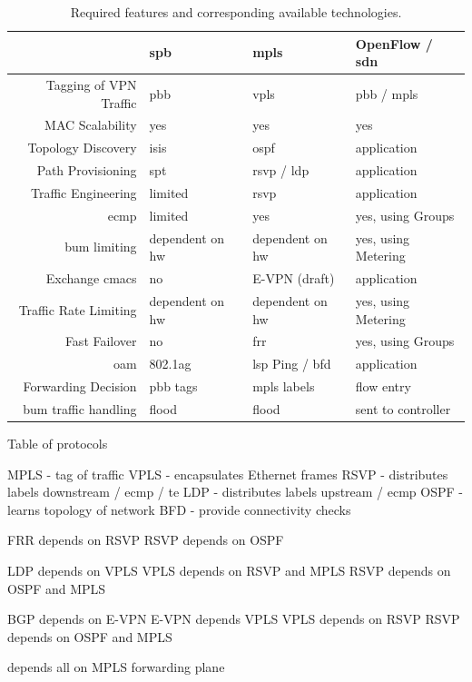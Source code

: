 \begin{table}[h]
	\centering
	\begin{tabular}{r|lll}
	 & \acs{spb} & \acs{mpls} & OpenFlow / \acs{sdn}\\
	\hline
	Tagging of VPN Traffic & \acs{pbb} & \acs{vpls} & \acs{pbb} / \acs{mpls}\\
	MAC Scalability & yes & yes & yes\\
	Topology Discovery & \acs{isis} & \acs{ospf} & application\\
	Path Provisioning & \acs{spt} & \acs{rsvp} / \acs{ldp} & application\\
	Traffic Engineering & limited & \acs{rsvp} & application\\
	\ac{ecmp} & limited & yes & yes, using Groups\\
	\ac{bum} limiting & dependent on \acs{hw} & dependent on \acs{hw} & yes, using Metering\\
	Exchange \acsp{cmac} & no & E-VPN (draft) & application\\
	Traffic Rate Limiting & dependent on \acs{hw} & dependent on \acs{hw} & yes, using Metering\\
	Fast Failover & no & \acs{frr} & yes, using Groups\\
	\acs{oam} & 802.1ag & \acs{lsp} Ping / \acs{bfd} & application\\
	\hline
	Forwarding Decision & \acs{pbb} tags & \acs{mpls} labels & flow entry \\
	\ac{bum} traffic handling & flood & flood & sent to controller\\
	\end{tabular}
	\caption{Required features and corresponding available technologies.}
	\label{tb:reqs}
\end{table}




Table of protocols

MPLS - tag of traffic
VPLS - encapsulates Ethernet frames
RSVP - distributes labels downstream / ecmp / te
LDP - distributes labels upstream / ecmp
OSPF - learns topology of network
BFD - provide connectivity checks

FRR depends on RSVP
RSVP depends on OSPF

LDP depends on VPLS
VPLS depends on RSVP and MPLS
RSVP depends on OSPF and MPLS

BGP depends on E-VPN
E-VPN depends VPLS
VPLS depends on RSVP
RSVP depends on OSPF and MPLS

depends all on MPLS forwarding plane

